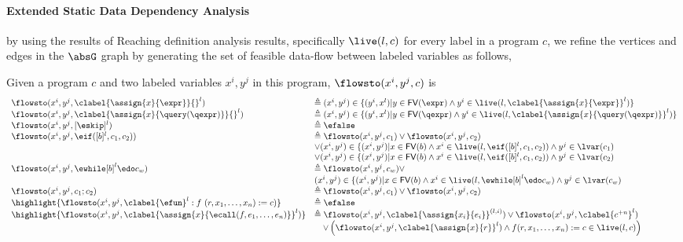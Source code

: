 \paragraph{Extended Static Data Dependency Analysis}
\label{sec:refine-static-datadep}
by using the results of Reaching definition analysis results, specifically $\live(l, c)$ for every label in a program $c$, we refine the vertices and edges in the $\absG$ graph 
by generating the set of feasible data-flow between labeled variables as follows,
\begin{defn}
  \label{def:feasible_flowsto}
  Given a program $c$ and two labeled variables $x^i, y^j$  in this program, 
  $\flowsto(x^i, y^j, c)$ is 
    {\footnotesize
    \[
   \begin{array}{ll}
    \flowsto(x^i, y^j, \clabel{\assign{x}{\expr}}{}^l)  & \triangleq (x^i, y^j) \in \{ (y^i, x^l) | y \in \mathsf{FV}(\expr) 
    \land y^i \in \live(l, \clabel{\assign{x}{\expr}}^l) \}  \\
    \flowsto(x^i, y^j, \clabel{\assign{x}{\query(\qexpr)}}{}^l)  & \triangleq (x^i, y^j) \in \{ (y^i, x^l) | y \in \mathsf{FV}(\qexpr) 
    \land y^i \in \live(l,\clabel{\assign{x}{\query(\qexpr)}}^l) \}  \\
    \flowsto(x^i, y^j, [\eskip]^{l}) & \triangleq \efalse \\
    \flowsto(x^i, y^j, \eif ([b]^l, c_1, c_2))  & \triangleq \flowsto(x^i, y^j, c_1) \lor \flowsto(x^i, y^j, c_2) \\ 
        & \lor (x^i, y^j) \in
       \{(x^i,y^j) | x \in \mathsf{FV}(b) \land 
      x^i \in \live(l, \eif ([b]^l, c_1, c_2)) \land  y^j \in \lvar(c_1) \\
       &\lor (x^i, y^j) \in \{(x^i,y^j) | x \in \mathsf{FV}(b) \land 
      x^i\in \live(l, \eif ([b]^l, c_1, c_2))  \land  y^j \in \lvar(c_2) \\
       \flowsto(x^i, y^j, \ewhile [b]^l \edo c_w)  & \triangleq  \flowsto(x^i, y^j, c_w)  \lor
       \\ & 
       (x^i, y^j) \in  \{(x^i,y^j) | x \in \mathsf{FV}(b) \land 
      x^i \in \live(l,   \ewhile [b]^l \edo c_w) \land  y^j \in \lvar(c_w) \\
      \flowsto(x^i, y^j, c_1 ;c_2)  & \triangleq \flowsto(x^i, y^j, c_1) \lor \flowsto(x^i, y^j, c_2) \\
      {\highlight{\flowsto(x^i, y^j, \clabel{\efun}^l: f ~ (r, x_1, \ldots, x_n) := c) }}
       & \triangleq \efalse\\
       {\highlight{\flowsto(x^i, y^j, \clabel{\assign{x}{\ecall(f, e_1, \ldots, e_n)}}^l )} } 
       &     
       \triangleq
       \flowsto(x^i, y^j, \clabel{\assign{x_i}{e_i}}^{(l,i)}) \lor
       \flowsto(x^i, y^j, \clabel{c^{+n}}^l) 
       \\ & \quad
       \lor
       \left(\flowsto(x^i, y^j, \clabel{\assign{x}{r}}^{l}) 
       \land f(r, x_1, \ldots, x_n) := c\in \live(l, c) \right)
   \end{array}
   \]
   }
   \end{defn}
